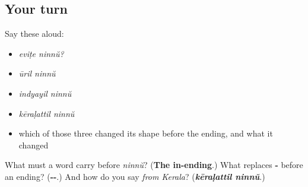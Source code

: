 \subsection*{Your turn}
Say these aloud:

\begin{itemize}
\raggedright
  \item \emph{eviṭe ninnŭ?}
  \item \emph{ūril ninnŭ}
  \item \emph{indyayil ninnŭ}
  \item \emph{kēraḷattil ninnŭ}
  \item which of those three changed its shape before the ending, and what it changed
\end{itemize}

\begin{tcolorbox}[breakable,colback=teal!4,colframe=teal!35!black,title={Before you move on}]
What must a word carry before \emph{ninnŭ}? (\textbf{The in-ending}.) What replaces \textbf{-} before an ending? (\textbf{--}.) And how do you say \emph{from Kerala}? (\emph{\textbf{kēraḷattil ninnŭ}}.)
\end{tcolorbox}
